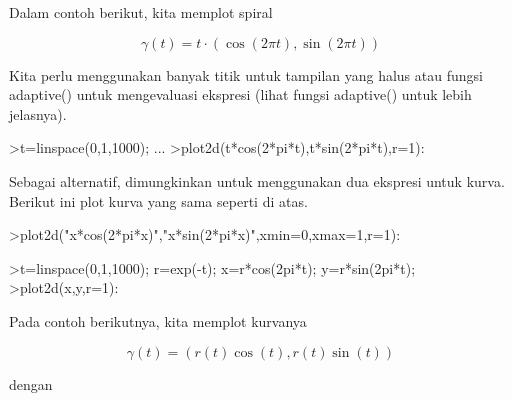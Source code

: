 \documentclass[a4paper,10pt]{article}
\begin{document}
\begin{eulernotebook}
\begin{eulercomment}
\begin{eulercomment}
\begin{eulercomment}
\begin{eulercomment}
\begin{eulercomment}
\begin{eulercomment}
\begin{eulercomment}
\begin{eulercomment}
\begin{eulercomment}
Dalam contoh berikut, kita memplot spiral

\end{eulercomment}
\begin{eulerformula}
\[
\gamma(t) = t \cdot (\cos(2\pi t),\sin(2\pi t))
\]
\end{eulerformula}
\begin{eulercomment}
Kita perlu menggunakan banyak titik untuk tampilan yang halus atau
fungsi adaptive() untuk mengevaluasi ekspresi (lihat fungsi adaptive()
untuk lebih jelasnya).
\end{eulercomment}
\begin{eulerprompt}
>t=linspace(0,1,1000); ...
>plot2d(t*cos(2*pi*t),t*sin(2*pi*t),r=1):
\end{eulerprompt}
\begin{eulercomment}
Sebagai alternatif, dimungkinkan untuk menggunakan dua ekspresi untuk
kurva. Berikut ini plot kurva yang sama seperti di atas.
\end{eulercomment}
\begin{eulerprompt}
>plot2d("x*cos(2*pi*x)","x*sin(2*pi*x)",xmin=0,xmax=1,r=1):
\end{eulerprompt}
\begin{eulerprompt}
>t=linspace(0,1,1000); r=exp(-t); x=r*cos(2pi*t); y=r*sin(2pi*t);
>plot2d(x,y,r=1):
\end{eulerprompt}
\begin{eulercomment}
Pada contoh berikutnya, kita memplot kurvanya

\end{eulercomment}
\begin{eulerformula}
\[
\gamma(t) = (r(t) \cos(t), r(t) \sin(t))
\]
\end{eulerformula}
\begin{eulercomment}
dengan


\end{eulercomment}
\end{eulercomment}
\end{eulercomment}
\end{eulercomment}
\end{eulercomment}
\end{eulercomment}
\end{eulercomment}
\end{eulercomment}
\end{eulercomment}
\end{eulernotebook}
\end{document}
